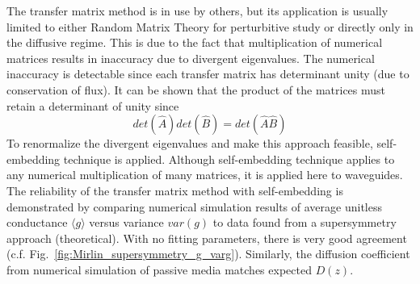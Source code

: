 The transfer matrix method is in use by others\cite{2007_Froufe-Perez_PRE}, but its application is usually limited to either Random Matrix Theory for perturbitive study or directly only in the diffusive regime. This is due to the fact that multiplication of numerical matrices results in inaccuracy due to divergent eigenvalues\cite{1968_Osedelec}.
The numerical inaccuracy is detectable since each transfer matrix has determinant unity (due to conservation of flux). 
It can be shown that the product of the matrices must retain a determinant of unity since
\begin{equation}
det(\hat{A})det(\hat{B})=det(\hat{A}\hat{B})
\end{equation}
To renormalize the divergent eigenvalues and make this approach feasible, self-embedding technique \cite{2001_Yamilov} \cite{1999_yamilov_selfembed}  \cite{1976_Bellman_Wing_embedding} is applied.
%
%
Although self-embedding technique applies to any numerical multiplication of many matrices, it is applied here to waveguides.%
The reliability of the transfer matrix method with self-embedding is demonstrated by comparing numerical simulation results of average unitless conductance $\langle g \rangle$ versus variance $var(g)$ to data found from a supersymmetry approach (theoretical)\cite{2000_Mirlin}. With no fitting parameters, there is very good agreement (c.f. Fig.~\ref{fig:Mirlin_supersymmetry_g_varg}). Similarly, the diffusion coefficient from numerical simulation of passive media matches expected $D(z)$.


